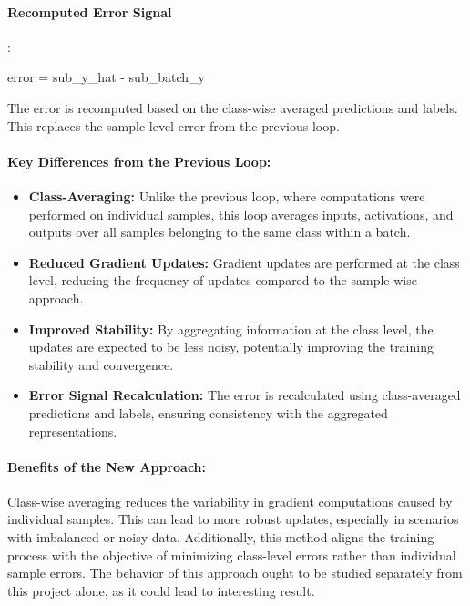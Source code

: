 \documentclass[english]{article}
\begin{document}
\paragraph{Recomputed Error Signal}:
\begin{python}
error = sub_y_hat - sub_batch_y
\end{python}
The error is recomputed based on the class-wise averaged predictions and labels. This replaces the sample-level error from the previous loop.

\paragraph{Key Differences from the Previous Loop:}
\begin{itemize}
    \item \textbf{Class-Averaging:} 
    Unlike the previous loop, where computations were performed on individual samples, this loop averages inputs, activations, and outputs over all samples belonging to the same class within a batch.
    \item \textbf{Reduced Gradient Updates:}
    Gradient updates are performed at the class level, reducing the frequency of updates compared to the sample-wise approach.
    \item \textbf{Improved Stability:}
    By aggregating information at the class level, the updates are expected to be less noisy, potentially improving the training stability and convergence.
    \item \textbf{Error Signal Recalculation:}
    The error is recalculated using class-averaged predictions and labels, ensuring consistency with the aggregated representations.
\end{itemize}

\paragraph{Benefits of the New Approach:}
Class-wise averaging reduces the variability in gradient computations caused by individual samples. This can lead to more robust updates, especially in scenarios with imbalanced or noisy data. Additionally, this method aligns the training process with the objective of minimizing class-level errors rather than individual sample errors. The behavior of this approach ought to be studied separately from this project alone, as it could lead to interesting result.
\end{document}
